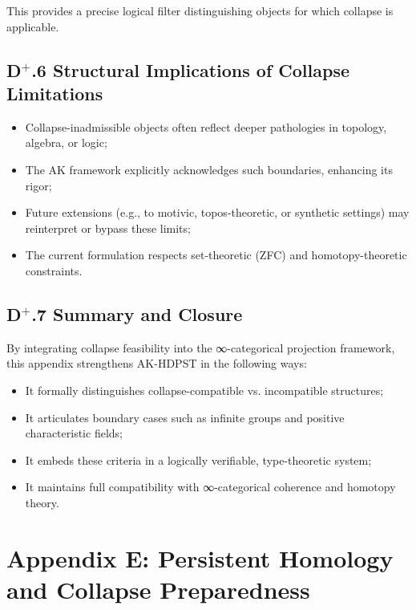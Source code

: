 \documentclass[11pt]{article}
\begin{document}
This provides a precise logical filter distinguishing objects for which collapse is applicable.

\subsection*{D$^{+}$.6 Structural Implications of Collapse Limitations}

\begin{itemize}
\item Collapse-inadmissible objects often reflect deeper pathologies in topology, algebra, or logic;
\item The AK framework explicitly acknowledges such boundaries, enhancing its rigor;
\item Future extensions (e.g., to motivic, topos-theoretic, or synthetic settings) may reinterpret or bypass these limits;
\item The current formulation respects set-theoretic (ZFC) and homotopy-theoretic constraints.
\end{itemize}

\subsection*{D$^{+}$.7 Summary and Closure}

By integrating collapse feasibility into the ∞-categorical projection framework, this appendix strengthens AK-HDPST in the following ways:

\begin{itemize}
\item It formally distinguishes collapse-compatible vs. incompatible structures;
\item It articulates boundary cases such as infinite groups and positive characteristic fields;
\item It embeds these criteria in a logically verifiable, type-theoretic system;
\item It maintains full compatibility with ∞-categorical coherence and homotopy theory.
\end{itemize}



\section*{Appendix E: Persistent Homology and Collapse Preparedness}
\end{document}
